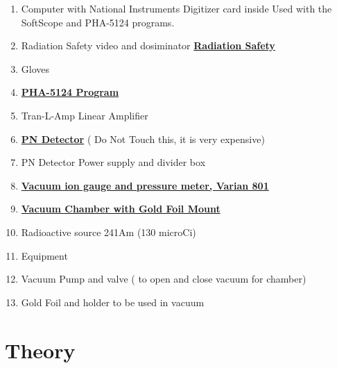 \documentclass{../lab}
\begin{document}
\begin{enumerate}
    \item Computer with National Instruments Digitizer card inside Used with the SoftScope and PHA-5124 programs.

    \item Radiation Safety video and dosiminator \href{http://experimentationlab.berkeley.edu/RadiationSafety}{\textbf{Radiation Safety}}

    \item Gloves

    \item \href{http://experimentationlab.berkeley.edu/PHA-5124Program}{\textbf{PHA-5124 Program}}

    \item Tran-L-Amp Linear Amplifier

    \item \href{http://physics111.lib.berkeley.edu/Physics111/Reprints/RUT/RUT\_Detector\_018.JPG}{\textbf{PN Detector}} ( Do Not Touch this, it is very expensive)

    \item PN Detector Power supply and divider box

    \item \href{http://physics111.lib.berkeley.edu/Physics111/Reprints/RUT/Thermo\_Couple\_ionGauge.pdf}{\textbf{Vacuum ion gauge and pressure meter, Varian 801}}

    \item \href{http://physics111.lib.berkeley.edu/Physics111/Reprints/RUT/RUT\_Chamber\_017.JPG}{\textbf{Vacuum Chamber with Gold Foil Mount}}

    \item Radioactive source 241Am (130 microCi)

    \item Equipment

    \item Vacuum Pump and valve ( to open and close vacuum for chamber)

    \item Gold Foil and holder to be used in vacuum

\end{enumerate}

\section{Theory}
\end{document}
